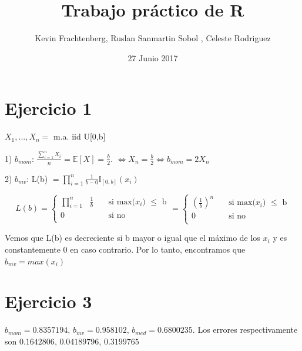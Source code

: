 \documentclass{article}
\title{Trabajo práctico de R}
\author{Kevin Frachtenberg, Ruslan Sanmartin Sobol , Celeste Rodriguez}
\date{27 Junio 2017}
\begin{document}
\maketitle

\section{Ejercicio 1}

$X_1,...,X_n =$ m.a. iid U[0,b]

1) $b_{mom}$: $\frac{\sum_{i=1}^{n} X_i}{n} = \mathbb{E}[X] = \frac{b}{2}$. $\Longleftrightarrow X_n = \frac{b}{2} \Longleftrightarrow b_{mom} = 2X_n$
\newline

2) $b_{mv}$: L(b) $= \prod_{i=1}^{n} \frac{1}{b-0} \mathds{I}_{[0,b]}(x_i)$


\[
L(b) = 
     \begin{cases}
       \text{$\prod_{i=1}^{n}$ $\frac{1}{b}$} &\quad\text{si max($x_i$) $\leq$ b}\\
       \text{0} &\quad\text{si no}\\ 
     \end{cases}
=
     \begin{cases}
       \text{$(\frac{1}{b})^n$} &\quad\text{si max($x_i$) $\leq$ b}\\
       \text{0} &\quad\text{si no}\\ 
     \end{cases}
\]

Vemos que L(b) es decreciente si b mayor o igual que el máximo de los $x_i$ y es constantemente 0 en caso contrario. Por lo tanto, encontramos que $b_{mv} = max(x_i)$

\newline

\section{Ejercicio 3} $b_{mom} = 0.8357194$, $b_{mv} = 0.958102$, $b_{med} = 0.6800235$. Los errores respectivamente son $0.1642806$, $0.04189796$, $0.3199765$
\end{document}
